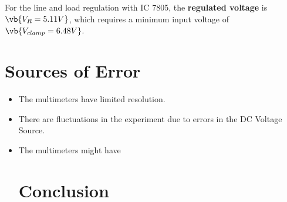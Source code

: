 \documentclass{scrartcl}
\newcommand{\1}{\mathbbm{1}}
\begin{document}
For the line and load regulation with IC 7805, the \textbf{regulated voltage} is $\vb{V_R = 5.11V}$, which 
requires a minimum input voltage of $\vb{V_{clamp} = 6.48V}$.
\section{Sources of Error}
\begin{itemize}
	\item The multimeters have limited resolution.
	\item There are fluctuations in the experiment due to errors in the DC Voltage Source.
	\item The multimeters might have 
\section{Conclusion}
\newpage

\end{itemize}
\end{document}
